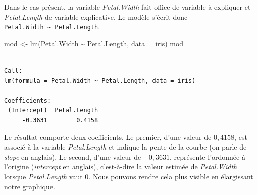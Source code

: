 \documentclass[
  letterpaper,
  DIV=11,
  numbers=noendperiod,
  oneside]{scrreprt}
\newenvironment{Shaded}{\begin{snugshade}}{\end{snugshade}}
\newcommand{\AttributeTok}[1]{\textcolor[rgb]{0.40,0.45,0.13}{#1}}
\newcommand{\DecValTok}[1]{\textcolor[rgb]{0.68,0.00,0.00}{#1}}
\newcommand{\FunctionTok}[1]{\textcolor[rgb]{0.28,0.35,0.67}{#1}}
\newcommand{\NormalTok}[1]{\textcolor[rgb]{0.00,0.23,0.31}{#1}}
\newcommand{\OtherTok}[1]{\textcolor[rgb]{0.00,0.23,0.31}{#1}}
\newcommand{\SpecialCharTok}[1]{\textcolor[rgb]{0.37,0.37,0.37}{#1}}
\newcommand{\StringTok}[1]{\textcolor[rgb]{0.13,0.47,0.30}{#1}}
\begin{document}
Dans le cas présent, la variable \emph{Petal.Width} fait office de
variable à expliquer et \emph{Petal.Length} de variable explicative. Le
modèle s'écrit donc
\texttt{Petal.Width\ \textasciitilde{}\ Petal.Length}.

\begin{Shaded}
\begin{Highlighting}[]
\NormalTok{mod }\OtherTok{\textless{}{-}} \FunctionTok{lm}\NormalTok{(Petal.Width }\SpecialCharTok{\textasciitilde{}}\NormalTok{ Petal.Length, }\AttributeTok{data =}\NormalTok{ iris)}
\NormalTok{mod}
\end{Highlighting}
\end{Shaded}

\begin{verbatim}

Call:
lm(formula = Petal.Width ~ Petal.Length, data = iris)

Coefficients:
 (Intercept)  Petal.Length  
     -0.3631        0.4158  
\end{verbatim}

Le résultat comporte deux coefficients. Le premier, d'une valeur de
\(0,4158\), est associé à la variable \emph{Petal.Length} et indique la
pente de la courbe (on parle de \emph{slope} en anglais). Le second,
d'une valeur de \(-0,3631\), représente l'ordonnée à l'origine
(\emph{intercept} en anglais), c'est-à-dire la valeur estimée de
\emph{Petal.Width} lorsque \emph{Petal.Length} vaut 0. Nous pouvons
rendre cela plus visible en élargissant notre graphique.

\begin{Shaded}
\end{Shaded}
\end{document}
